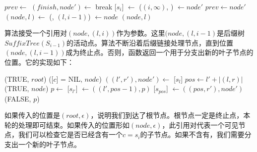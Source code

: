 \documentclass[UTF8]{article}
\begin{document}
\begin{algorithmic}[1]
  \State $prev \gets$   %
  \Loop {}
    \State $(finish, node') \gets$ 
      \State break
    \EndIf
    \State {}[$s_i$] $\gets$ ($(i, \infty)$, )
    \State {} $\gets node'$
    \State $prev \gets node'$
    \State $(node, l) \gets$ (, $(l, i-1)$)
  \EndLoop
  \State {} $\gets node$
  \State \Return $(node, l)$ 
\EndFunction
\end{algorithmic}

算法接受一个引用对$(node, (l, i))$作为参数。这里$(node, (l, i-1)$是后缀树$SuffixTree(S_{i-1})$的活动点。算法不断沿着后缀链接处理节点，直到位置$(node, (l, i-1))$成为终止点。否则，函数返回一个用于分支出新的叶子节点的位置。它的实现如下：

\begin{algorithmic}
      \State \Return (TRUE, $root$)
    \Else
      \State \Return ([$c$] = NIL, $node$)
    \EndIf
  \Else
    \State $((l', r'), node') \gets$ [$s_l$]
    \State $pos \gets l' + |(l, r)|$
      \State \Return (TRUE, $node$)
    \Else
      \State $p \gets$ 
      \State {}[$s_{l'}$] $\gets ((l', pos-1), p)$
      \State {}[$s_{pos}$] $\gets ((pos, r'), node')$
      \State \Return (FALSE, $p$)
    \EndIf
  \EndIf
\EndFunction
\end{algorithmic}

如果传入的位置是$(root, \epsilon)$，说明我们到达了根节点。根节点一定是终止点，本轮的处理即可结束。如果传入的位置形如$(node, \epsilon)$，此引用对代表一个可见节点，我们可以检查它是否已经含有一个$c=s_i$的子节点。如果不含有，我们需要分支出一个新的叶子节点。
\end{document}
